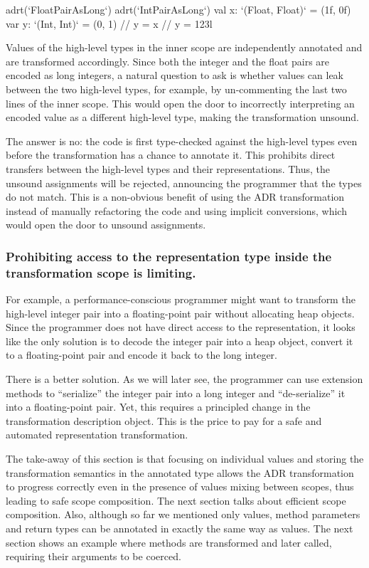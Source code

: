 \begin{lstlisting-nobreak}
adrt(`FloatPairAsLong`) {
  adrt(`IntPairAsLong`) {
    val x: `(Float, Float)` = (1f, 0f)
    var y: `(Int, Int)` = (0, 1)
    // y = x
    // y = 123l
  }
}
\end{lstlisting-nobreak}

Values of the high-level types in the inner scope are independently annotated and are transformed accordingly. Since both the integer and the float pairs are encoded as long integers, a natural question to ask is whether values can leak between the two high-level types, for example, by un-commenting the last two lines of the inner scope. This would open the door to incorrectly interpreting an encoded value as a different high-level type, making the transformation unsound.

The answer is no: the code is first type-checked against the high-level types even before the \inject{} transformation has a chance to annotate it. This prohibits direct transfers between the high-level types and their representations. Thus, the unsound assignments will be rejected, announcing the programmer that the types do not match. This is a non-obvious benefit of using the ADR transformation instead of manually refactoring the code and using implicit conversions, which would open the door to unsound assignments.


\subsubsection{Prohibiting access to the representation type inside the transformation scope is limiting.} For example, a performance-conscious programmer might want to transform the high-level integer pair into a floating-point pair without allocating heap objects. Since the programmer does not have direct access to the representation, it looks like the only solution is to decode the integer pair into a heap object, convert it to a floating-point pair and encode it back to the long integer.

There is a better solution. As we will later see, the programmer can use extension methods to ``serialize'' the integer pair into a long integer and ``de-serialize'' it into a floating-point pair. Yet, this requires a principled change in the transformation description object. This is the price to pay for a safe and automated representation transformation.

The take-away of this section is that focusing on individual values and storing the transformation semantics in the annotated type allows the ADR transformation to progress correctly even in the presence of values mixing between scopes, thus leading to safe scope composition. The next section talks about efficient scope composition. Also, although so far we mentioned only values, method parameters and return types can be annotated in exactly the same way as values. The next section shows an example where methods are transformed and later called, requiring their arguments to be coerced.








